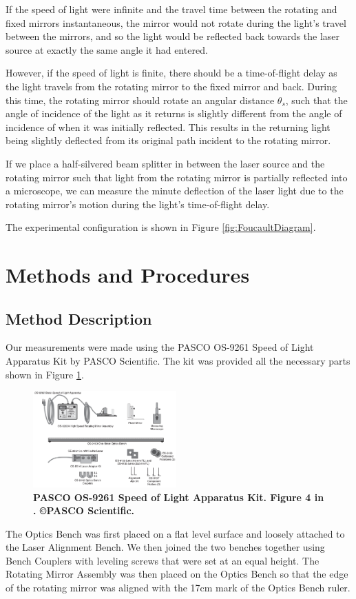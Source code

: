 \documentclass[twocolumn]{article}
\begin{document}
		If the speed of light were infinite and the travel time between the rotating and fixed mirrors instantaneous, the mirror would not rotate during the light's travel between the mirrors, and so the light would be reflected back towards the laser source at exactly the same angle it had entered.
		
		However, if the speed of light is finite, there should be a time-of-flight delay as the light travels from the rotating mirror to the fixed mirror and back.
		During this time, the rotating mirror should rotate an angular distance $\theta_s$, such that the angle of incidence of the light as it returns is slightly different from the angle of incidence of when it was initially reflected.
		This results in the returning light being slightly deflected from its original path incident to the rotating mirror.
		
		If we place a half-silvered beam splitter in between the laser source and the rotating mirror such that light from the rotating mirror is partially reflected into a microscope, we can measure the minute deflection of the laser light due to the rotating mirror's motion during the light's time-of-flight delay.
		
		The experimental configuration is shown in Figure \ref{fig:FoucaultDiagram}.
		
\section{Methods and Procedures}
	\label{sec:Methods}
	\subsection{Method Description}
		Our measurements were made using the PASCO OS-9261 Speed of Light Apparatus Kit by PASCO Scientific.
		The kit was provided all the necessary parts shown in Figure \ref{fig:LabEquip}.
		\begin{figure}[!ht]
			\centering
			\includegraphics[width=0.49\textwidth]{Images/PASCO_Equipment.png}
			\caption{\textbf{PASCO OS-9261 Speed of Light Apparatus Kit. Figure 4 in \cite{lee_instruction_????}. \copyright PASCO Scientific.}}
			\label{fig:LabEquip}
		\end{figure}
		The Optics Bench was first placed on a flat level surface and loosely attached to the Laser Alignment Bench.  
		We then joined the two benches together using Bench Couplers with leveling screws that were set at an equal height.  
		The Rotating Mirror Assembly was then placed on the Optics Bench so that the edge of the rotating mirror was aligned with the 17cm mark of the Optics Bench ruler.
		
\end{document}
